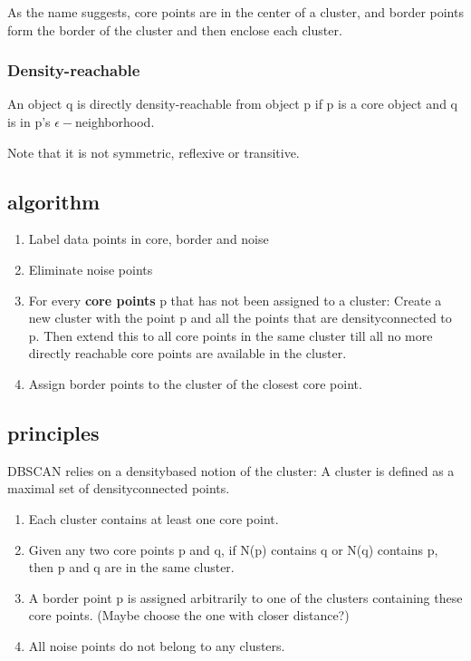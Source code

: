 \documentclass[letterpaper,12pt]{article}
\begin{document}
As the name suggests, core points are in the center of a cluster, and border points form the border of the cluster and then enclose each cluster. 

\subsubsection{Density-reachable}
An object q is directly density-reachable from object p if p is a core object and q is in p's $\epsilon-$neighborhood. 

Note that it is not symmetric, reflexive or transitive. 

\subsection{algorithm}
\begin{enumerate}
    \item Label data points in core, border and noise
    \item Eliminate noise points
    \item For every \textbf{core points} p that has not been assigned to a cluster: Create a new cluster with the point p and all the points that are density\-connected to p. Then extend this to all core points in the same cluster till all no more directly reachable core points are available in the cluster.
    \item Assign border points to the cluster of the closest core point.
\end{enumerate}

\subsection{principles}
DBSCAN relies on a density\-based notion of the cluster: A cluster is defined as a maximal set of density\-connected points.
\begin{enumerate}
    \item Each cluster contains at least one core point.
    \item Given any two core points p and q, if N(p) contains q or N(q) contains p, then p and q are in the same cluster.
    \item A border point p is assigned arbitrarily to one of the clusters containing these core points. (Maybe choose the one with closer distance?)
    \item All noise points do not belong to any clusters.
\end{enumerate}
\end{document}
